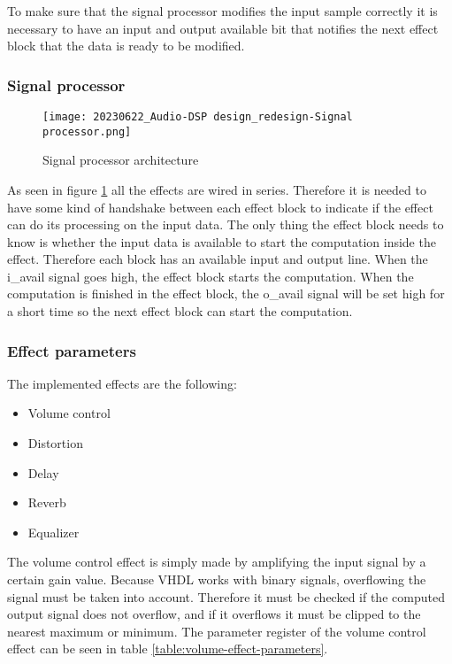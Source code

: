 To make sure that the signal processor modifies the input sample correctly it is necessary to have an input and output available bit that notifies the next effect block that the data is ready to be modified. 

\subsubsection{Signal processor}
\begin{figure}[ht]
    \texttt{[image: 20230622\_Audio-DSP design\_redesign-Signal processor.png]}
    \caption{Signal processor architecture}
    \label{fig:arch-signal-processor}
\end{figure}

As seen in figure \ref{fig:arch-signal-processor} all the effects are wired in series. Therefore it is needed to have some kind of handshake between each effect block to indicate if the effect can do its processing on the input data. The only thing the effect block needs to know is whether the input data is available to start the computation inside the effect. Therefore each block has an available input and output line. When the i\_avail signal goes high, the effect block starts the computation. When the computation is finished in the effect block, the o\_avail signal will be set high for a short time so the next effect block can start the computation.

\subsubsection{Effect parameters}
The implemented effects are the following:

\begin{itemize}
    \setlength\itemsep{-0.3em} %
    \item Volume control
    \item Distortion
    \item Delay
    \item Reverb
    \item Equalizer
\end{itemize}

The volume control effect is simply made by amplifying the input signal by a certain gain value. Because VHDL works with binary signals, overflowing the signal must be taken into account. Therefore it must be checked if the computed output signal does not overflow, and if it overflows it must be clipped to the nearest maximum or minimum. The parameter register of the volume control effect can be seen in table \ref{table:volume-effect-parameters}.


